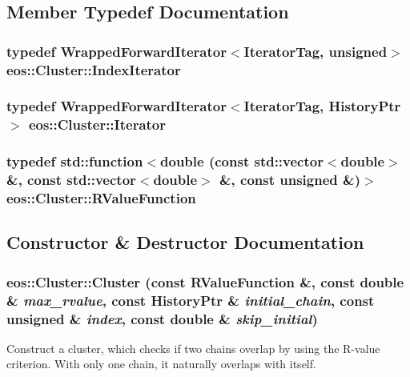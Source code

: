 \subsection{Member Typedef Documentation}
\hypertarget{classeos_1_1Cluster_a39df87b5549e245b185b26f94c9d336b}{
\subsubsection[{IndexIterator}]{\setlength{\rightskip}{0pt plus 5cm}typedef {\bf WrappedForwardIterator}$<$IteratorTag, unsigned$>$ {\bf eos::Cluster::IndexIterator}}}
\label{classeos_1_1Cluster_a39df87b5549e245b185b26f94c9d336b}
\hypertarget{classeos_1_1Cluster_ab60d3bac87825b6181c4c6bb1f04d55a}{
\subsubsection[{Iterator}]{\setlength{\rightskip}{0pt plus 5cm}typedef {\bf WrappedForwardIterator}$<$IteratorTag, {\bf HistoryPtr}$>$ {\bf eos::Cluster::Iterator}}}
\label{classeos_1_1Cluster_ab60d3bac87825b6181c4c6bb1f04d55a}
\hypertarget{classeos_1_1Cluster_a0c315d367de4288803597a0f23ee4168}{
\subsubsection[{RValueFunction}]{\setlength{\rightskip}{0pt plus 5cm}typedef std::function$<$double (const std::vector$<$double$>$ \&, const std::vector$<$double$>$ \&, const unsigned \&)$>$ {\bf eos::Cluster::RValueFunction}}}
\label{classeos_1_1Cluster_a0c315d367de4288803597a0f23ee4168}


\subsection{Constructor \& Destructor Documentation}
\hypertarget{classeos_1_1Cluster_a0f1f2be34f11be1bba6426ba20ebf999}{
\subsubsection[{Cluster}]{\setlength{\rightskip}{0pt plus 5cm}eos::Cluster::Cluster (const {\bf RValueFunction} \&, \/  const double \& {\em max\_\-rvalue}, \/  const {\bf HistoryPtr} \& {\em initial\_\-chain}, \/  const unsigned \& {\em index}, \/  const double \& {\em skip\_\-initial})}}
\label{classeos_1_1Cluster_a0f1f2be34f11be1bba6426ba20ebf999}
Construct a cluster, which checks if two chains overlap by using the R-\/value criterion. With only one chain, it naturally overlaps with itself.


